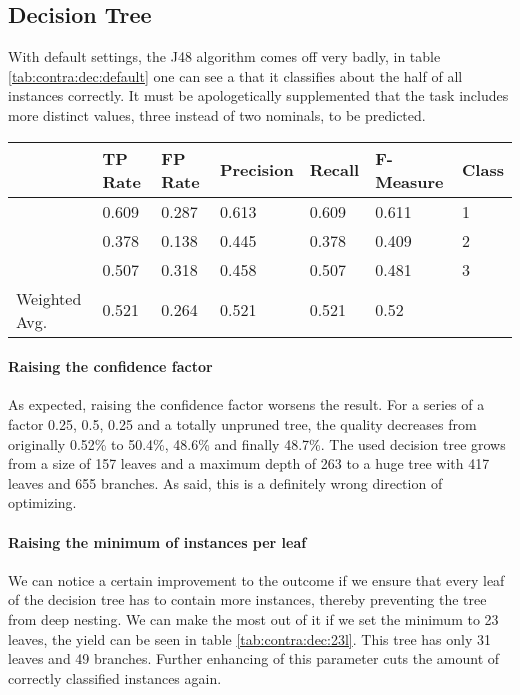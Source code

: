 \documentclass[paper=a4, fontsize=11pt]{scrartcl} %
\numberwithin{equation}{section} %
\numberwithin{figure}{section} %
\numberwithin{table}{section} %
\begin{document}
\subsection{Decision Tree}

With default settings, the J48 algorithm comes off very badly, in table \ref{tab:contra:dec:default} one can see a that it classifies about the half of all instances correctly. It must be apologetically supplemented that the task includes more distinct values, three instead of two nominals, to be predicted. 

\begin{table*}[htb]\centering
  \begin{tabular*}{\columnwidth}{@{}lllllll@{}}
      \toprule 
               &  TP Rate & FP Rate & Precision & Recall & F-Measure &  Class \\ \midrule 
               &  0.609   & 0.287   & 0.613     & 0.609  & 0.611     &  1     \\  
               &  0.378   & 0.138   & 0.445     & 0.378  & 0.409     &  2     \\      
               &  0.507   & 0.318   & 0.458     & 0.507  & 0.481     &  3     \\      
Weighted Avg.  &  0.521   & 0.264   & 0.521     & 0.521  & 0.52      &        \\ \bottomrule     
    \end{tabular*}
\caption{Decision Tree on Contraceptive Data Set -- Default Settings} 
\label{tab:contra:dec:default}
\end{table*}
\FloatBarrier

\paragraph{Raising the confidence factor}
As expected, raising the confidence factor worsens the result. For a series of a factor 0.25, 0.5, 0.25 and a totally unpruned tree, the quality decreases from originally 0.52\% to 50.4\%, 48.6\% and finally 48.7\%. The used decision tree grows from a size of 157 leaves and a maximum depth of 263 to a huge tree with 417 leaves and 655 branches. As said, this is a definitely wrong direction of optimizing.

\paragraph{Raising the minimum of instances per leaf}
We can notice a certain improvement to the outcome if we ensure that every leaf of the decision tree has to contain more instances, thereby preventing the tree from deep nesting. We can make the most out of it if we set the minimum to 23 leaves, the yield can be seen in table \ref{tab:contra:dec:23l}. This tree has only 31 leaves and 49 branches. Further enhancing of this parameter cuts the amount of correctly classified instances again.
\end{document}
